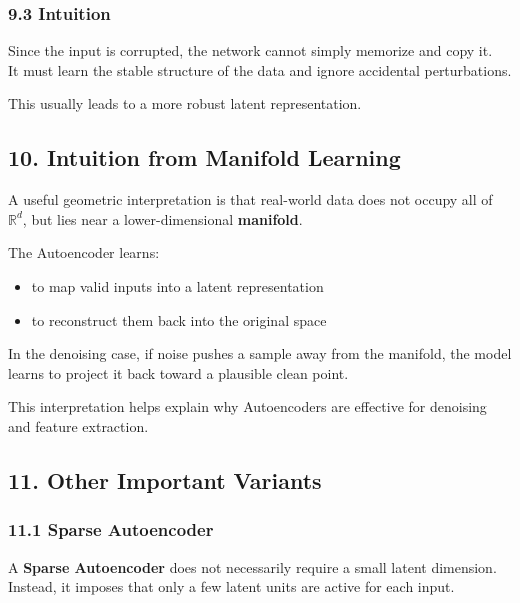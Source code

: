 \documentclass[
  italian,
  11pt,
]{article}
\begin{document}
\subsubsection{9.3 Intuition}\label{intuition-1}

Since the input is corrupted, the network cannot simply memorize and
copy it.\\
It must learn the stable structure of the data and ignore accidental
perturbations.

This usually leads to a more robust latent representation.

\subsection{10. Intuition from Manifold
Learning}\label{intuition-from-manifold-learning}

A useful geometric interpretation is that real-world data does not
occupy all of \(\mathbb{R}^d\), but lies near a lower-dimensional
\textbf{manifold}.

The Autoencoder learns:

\begin{itemize}
\item
  to map valid inputs into a latent representation
\item
  to reconstruct them back into the original space
\end{itemize}

In the denoising case, if noise pushes a sample away from the manifold,
the model learns to project it back toward a plausible clean point.

This interpretation helps explain why Autoencoders are effective for
denoising and feature extraction.

\subsection{11. Other Important
Variants}\label{other-important-variants}

\subsubsection{11.1 Sparse Autoencoder}\label{sparse-autoencoder}

A \textbf{Sparse Autoencoder} does not necessarily require a small
latent dimension.\\
Instead, it imposes that only a few latent units are active for each
input.
\end{document}
